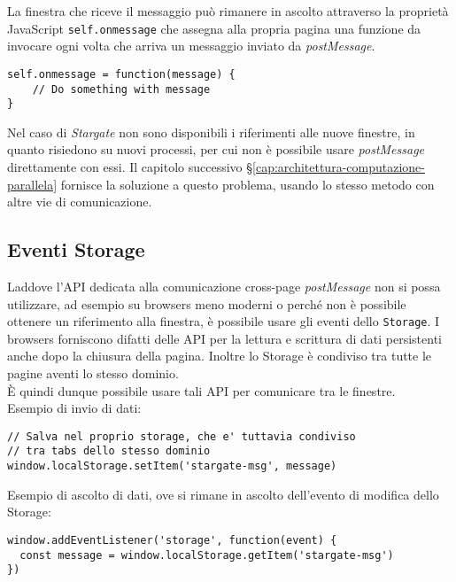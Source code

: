 La finestra che riceve il messaggio può rimanere in ascolto attraverso la proprietà JavaScript \texttt{self.onmessage} che assegna alla propria pagina una funzione da invocare ogni volta che arriva un messaggio inviato da \textit{postMessage}. \\

\vfill

\begin{lstlisting}[language={[Sharp]C}]
self.onmessage = function(message) {
    // Do something with message
}
\end{lstlisting}

Nel caso di \textit{Stargate} non sono disponibili i riferimenti alle nuove finestre, in quanto risiedono su nuovi processi, per cui non è possibile usare \textit{postMessage} direttamente con essi. Il capitolo successivo §\ref{cap:architettura-computazione-parallela} fornisce la soluzione a questo problema, usando lo stesso metodo con altre vie di comunicazione.

\subsection{Eventi Storage}

Laddove l'API dedicata alla comunicazione cross-page \textit{postMessage} non si possa utilizzare, ad esempio su browsers meno moderni o perché non è possibile ottenere un riferimento alla finestra, è possibile usare gli eventi dello \texttt{Storage}. I browsers forniscono difatti delle API per la lettura e scrittura di dati persistenti anche dopo la chiusura della pagina. Inoltre lo Storage è condiviso tra tutte le pagine aventi lo stesso dominio. \\

È quindi dunque possibile usare tali API per comunicare tra le finestre. \\

Esempio di invio di dati:

\begin{lstlisting}[language={[Sharp]C}]
// Salva nel proprio storage, che e' tuttavia condiviso
// tra tabs dello stesso dominio
window.localStorage.setItem('stargate-msg', message)
\end{lstlisting}

Esempio di ascolto di dati, ove si rimane in ascolto dell'evento di modifica dello Storage:

\begin{lstlisting}[language={[Sharp]C}]
window.addEventListener('storage', function(event) {
  const message = window.localStorage.getItem('stargate-msg')
})
\end{lstlisting}

